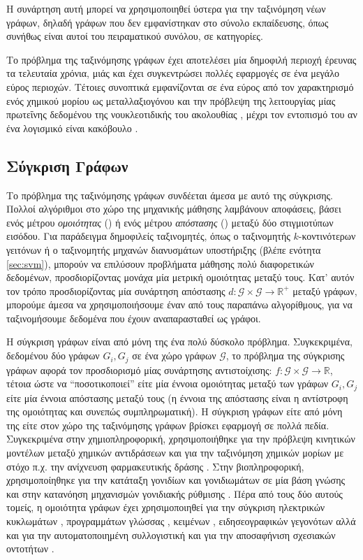 Η συνάρτηση αυτή μπορεί να χρησιμοποιηθεί ύστερα για την ταξινόμηση νέων γράφων, δηλαδή γράφων που δεν εμφανίστηκαν στο σύνολο εκπαίδευσης, όπως συνήθως είναι αυτοί του πειραματικού συνόλου, σε κατηγορίες.\par
Το πρόβλημα της ταξινόμησης γράφων έχει αποτελέσει μία δημοφιλή περιοχή έρευνας τα τελευταία χρόνια, μιάς και έχει συγκεντρώσει πολλές εφαρμογές σε ένα μεγάλο εύρος περιοχών.
Τέτοιες συνοπτικά εμφανίζονται σε ένα εύρος από τον χαρακτηρισμό ενός χημικού μορίου ως μεταλλαξιογόνου \cite{Swamidass2005} και την πρόβλεψη της λειτουργίας μίας πρωτεΐνης δεδομένου της νουκλεοτιδικής του ακολουθίας \cite{Borgwardt2005}, μέχρι τον εντοπισμό του αν ένα λογισμικό είναι κακόβουλο \cite{Wagner2009}.
\subsection{Σύγκριση Γράφων}
Το πρόβλημα της ταξινόμησης γράφων συνδέεται άμεσα με αυτό της σύγκρισης.
Πολλοί αλγόριθμοι στο χώρο της μηχανικής μάθησης λαμβάνουν αποφάσεις, βάσει ενός μέτρου \textit{ομοιότητας} () ή ενός μέτρου \textit{απόστασης} () μεταξύ δύο στιγμιοτύπων εισόδου.
Για παράδειγμα δημοφιλείς ταξινομητές, όπως ο ταξινομητής $k$-κοντινότερων γειτόνων ή ο ταξινομητής μηχανών διανυσμάτων υποστήριξης (βλέπε ενότητα \ref{sec:svm}), μπορούν να επιλύσουν προβλήματα μάθησης πολύ διαφορετικών δεδομένων, προσδιορίζοντας μονάχα μία μετρική ομοιότητας μεταξύ τους.
Κατ' αυτόν τον τρόπο προσδιορίζοντας μία συνάρτηση απόστασης $d : \mathcal{G} \times \mathcal{G} \rightarrow \mathbb{R}^{+}$ μεταξύ γράφων, μπορούμε άμεσα να χρησιμοποιήσουμε έναν από τους παραπάνω αλγορίθμους, για να ταξινομήσουμε δεδομένα που έχουν αναπαρασταθεί ως γράφοι.\par
Η σύγκριση γράφων είναι από μόνη της ένα πολύ δύσκολο πρόβλημα.
Συγκεκριμένα, δεδομένου δύο γράφων $G_{i}, G_{j}$ σε ένα χώρο γράφων $\mathcal{G}$, το πρόβλημα της σύγκρισης γράφων αφορά τον προσδιορισμό μίας συνάρτησης αντιστοίχισης: $f: \mathcal{G} \times \mathcal{G} \rightarrow \mathbb{R}$, τέτοια ώστε να ``ποσοτικοποιεί'' είτε μία έννοια ομοιότητας μεταξύ των γράφων $G_{i}, G_{j}$ είτε μία έννοια απόστασης μεταξύ τους (η έννοια της απόστασης είναι η αντίστροφη της ομοιότητας και συνεπώς συμπληρωματική).
Η σύγκριση γράφων είτε από μόνη της είτε στον χώρο της ταξινόμησης γράφων βρίσκει εφαρμογή σε πολλά πεδία.
Συγκεκριμένα στην χημιοπληροφορική, χρησιμοποιήθηκε για την πρόβλεψη κινητικών μοντέλων μεταξύ χημικών αντιδράσεων \cite{Genesys} και για την ταξινόμηση χημικών μορίων με στόχο π.χ. την ανίχνευση φαρμακευτικής δράσης \cite{Wale2008}.
Στην βιοπληροφορική, χρησιμοποίηθηκε για την κατάταξη γονιδίων και γονιδιωμάτων σε μία βάση γνώσης\cite{KEGG, Hattori2003} και στην κατανόηση μηχανισμών γονιδιακής ρύθμισης \cite{Davidson1669}.
Πέρα από τους δύο αυτούς τομείς, η ομοιότητα γράφων έχει χρησιμοποιηθεί για την σύγκριση ηλεκτρικών κυκλωμάτων \cite{Takashima1988}, προγραμμάτων γλώσσας  \cite{Gitchell1999}, κειμένων \cite{Rousseau2015TextCA}, ειδησεογραφικών γεγονότων \cite{Glavas2013} αλλά και για την αυτοματοποιημένη συλλογιστική \cite{Tsivtsivadze2011} και για την αποσαφήνιση σχεσιακών οντοτήτων \cite{Hermansson2013EntityDI}.
